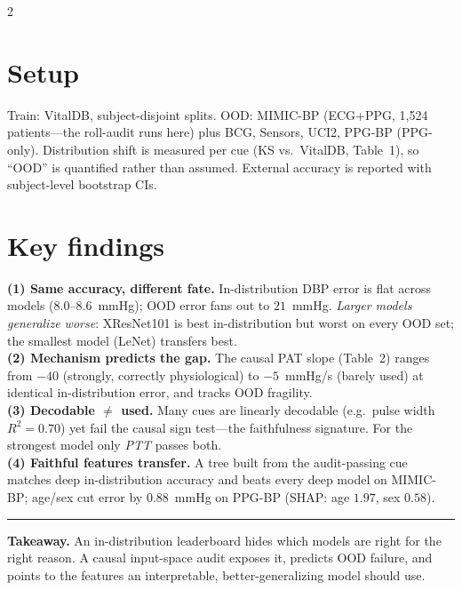 \documentclass[8pt]{extarticle}
\begin{document}
\vspace{4pt}
\begin{multicols}{2}
\section{Setup}
Train: VitalDB, subject-disjoint splits. OOD: MIMIC-BP (ECG+PPG, 1{,}524 patients---the
roll-audit runs here) plus BCG, Sensors, UCI2, PPG-BP (PPG-only). Distribution shift is measured
per cue (KS vs.\ VitalDB, Table~1), so ``OOD'' is quantified rather than assumed. External
accuracy is reported with subject-level bootstrap CIs.

\section{Key findings}
\textbf{(1) Same accuracy, different fate.} In-distribution DBP error is flat across models
($8.0$--$8.6$~mmHg); OOD error fans out to $21$~mmHg. \emph{Larger models generalize worse}:
XResNet101 is best in-distribution but worst on every OOD set; the smallest model (LeNet)
transfers best.\\
\textbf{(2) Mechanism predicts the gap.} The causal PAT slope (Table~2) ranges from $-40$
(strongly, correctly physiological) to $-5$~mmHg/s (barely used) at identical in-distribution
error, and tracks OOD fragility.\\
\textbf{(3) Decodable $\neq$ used.} Many cues are linearly decodable (e.g.\ pulse width
$R^2\!=\!0.70$) yet fail the causal sign test---the faithfulness signature. For the strongest
model only \emph{PTT} passes both.\\
\textbf{(4) Faithful features transfer.} A tree built from the audit-passing cue matches deep
in-distribution accuracy and beats every deep model on MIMIC-BP; age/sex cut error by
$0.88$~mmHg on PPG-BP (SHAP: age $1.97$, sex $0.58$).
\end{multicols}

\vspace{2pt}
\noindent\rule{\textwidth}{0.4pt}
{\footnotesize\textbf{Takeaway.} An in-distribution leaderboard hides which models are right for
the right reason. A causal input-space audit exposes it, predicts OOD failure, and points to the
features an interpretable, better-generalizing model should use.}
\end{document}

